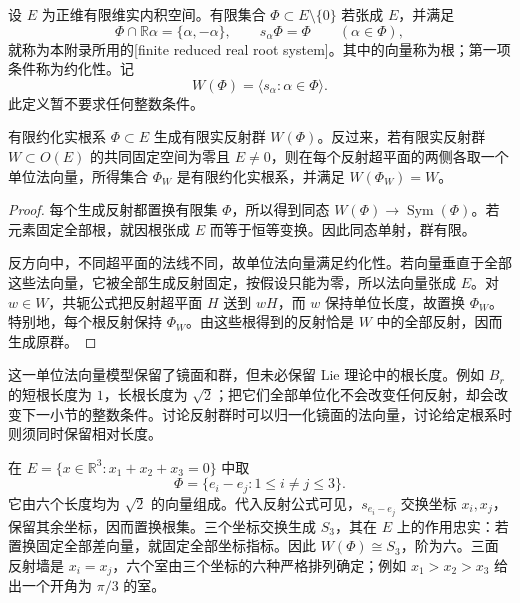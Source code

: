\begin{definition}[有限约化实根系]\label{g1:def:finite-real-root-system}
	设 \(E\) 为正维有限维实内积空间。有限集合 \(\Phi\subset E\setminus\{0\}\) 若张成 \(E\)，并满足
	\[
		\Phi\cap\mathbb R\alpha=\{\alpha,-\alpha\},\qquad
		s_\alpha\Phi=\Phi\qquad(\alpha\in\Phi),
	\]
	就称为本附录所用的[finite reduced real root system]。其中的向量称为根；第一项条件称为约化性。记
	\[
		W(\Phi)=\langle s_\alpha:\alpha\in\Phi\rangle.
	\]
	此定义暂不要求任何整数条件。
\end{definition}

\begin{proposition}\label{g1:prop:reflection-root-model}
	有限约化实根系 \(\Phi\subset E\) 生成有限实反射群 \(W(\Phi)\)。反过来，若有限实反射群 \(W\subset O(E)\) 的共同固定空间为零且 \(E\ne0\)，则在每个反射超平面的两侧各取一个单位法向量，所得集合 \(\Phi_W\) 是有限约化实根系，并满足 \(W(\Phi_W)=W\)。
\end{proposition}
\begin{proof}
	每个生成反射都置换有限集 \(\Phi\)，所以得到同态 \(W(\Phi)\to\operatorname{Sym}(\Phi)\)。若元素固定全部根，就因根张成 \(E\) 而等于恒等变换。因此同态单射，群有限。

	反方向中，不同超平面的法线不同，故单位法向量满足约化性。若向量垂直于全部这些法向量，它被全部生成反射固定，按假设只能为零，所以法向量张成 \(E\)。对 \(w\in W\)，共轭公式把反射超平面 \(H\) 送到 \(wH\)，而 \(w\) 保持单位长度，故置换 \(\Phi_W\)。特别地，每个根反射保持 \(\Phi_W\)。由这些根得到的反射恰是 \(W\) 中的全部反射，因而生成原群。
\end{proof}

这一单位法向量模型保留了镜面和群，但未必保留 Lie 理论中的根长度。例如 \(B_r\) 的短根长度为 \(1\)，长根长度为 \(\sqrt2\)；把它们全部单位化不会改变任何反射，却会改变下一小节的整数条件。讨论反射群时可以归一化镜面的法向量，讨论给定根系时则须同时保留相对长度。

\begin{example}\label{g1:eg:a2-reflection-model}
	在 \(E=\{x\in\mathbb R^3:x_1+x_2+x_3=0\}\) 中取
	\[
		\Phi=\{e_i-e_j:1\le i\ne j\le3\}.
	\]
	它由六个长度均为 \(\sqrt2\) 的向量组成。代入反射公式可见，\(s_{e_i-e_j}\) 交换坐标 \(x_i,x_j\)，保留其余坐标，因而置换根集。三个坐标交换生成 \(S_3\)，其在 \(E\) 上的作用忠实：若置换固定全部差向量，就固定全部坐标指标。因此 \(W(\Phi)\cong S_3\)，阶为六。三面反射墙是 \(x_i=x_j\)，六个室由三个坐标的六种严格排列确定；例如 \(x_1>x_2>x_3\) 给出一个开角为 \(\pi/3\) 的室。
\end{example}


